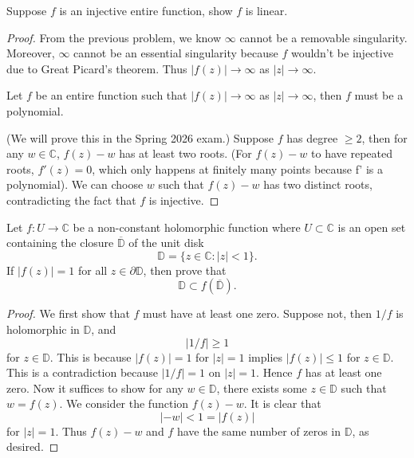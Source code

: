 \documentclass[openany]{book}
\newcommand{\C}{\mathbb{C}}
\newcommand{\D}{\mathbb{D}}
\begin{document}
\begin{prob}
    Suppose $f$ is an injective entire function, show $f$ is linear.
\end{prob}

\begin{proof}
    From the previous problem, we know $\infty$ cannot be a removable singularity. Moreover, $\infty$ cannot be an essential singularity because $f$ wouldn't be injective due to Great Picard's theorem. Thus $|f(z)|\to\infty$ as $|z|\to\infty$. 
    \begin{lem}
        Let $f$ be an entire function such that $|f(z)|\to\infty$ as $|z|\to\infty$, then $f$ must be a polynomial.
    \end{lem}
    (We will prove this in the Spring 2026 exam.) Suppose $f$ has degree $\geq 2$, then for any $w\in\C$, $f(z)-w$ has at least two roots. (For $f(z)-w$ to have repeated roots, $f'(z)=0$, which only happens at finitely many points because f' is a polynomial). We can choose $w$ such that $f(z)-w$ has two distinct roots, contradicting the fact that $f$ is injective. 
\end{proof}






\begin{prob}[Spring 2017, Q6]
    Let $f:U\to\mathbb{C}$ be a non-constant holomorphic function where
    $U\subset\mathbb{C}$ is an open set containing the closure $\overline{\D}$ of
    the unit disk
    \[
    \D=\{z\in\mathbb{C}:|z|<1\}.
    \]
    If $|f(z)|=1$ for all $z\in\partial\D$, then prove that
    \[
    \D\subset f(\overline{\D}).
    \]
\end{prob}

\begin{proof}
    We first show that $f$ must have at least one zero. Suppose not, then $1/f$ is holomorphic in $\D$, and 
    \begin{equation*}
        |1/f|\geq 1
    \end{equation*}
    for $z\in\D$. This is because $|f(z)|=1$ for $|z|=1$ implies $|f(z)|\leq 1$ for $z\in\D$. This is a contradiction because $|1/f|=1$ on $|z|=1$. Hence $f$ has at least one zero. Now it suffices to show for any $w\in\D$, there exists some $z\in\D$ such that $w=f(z)$. We consider the function $f(z)-w$. It is clear that 
    \begin{equation*}
        |-w|<1=|f(z)|
    \end{equation*}
    for $|z|=1$. Thus $f(z)-w$ and $f$ have the same number of zeros in $\D$, as desired.
\end{proof}
\end{document}
